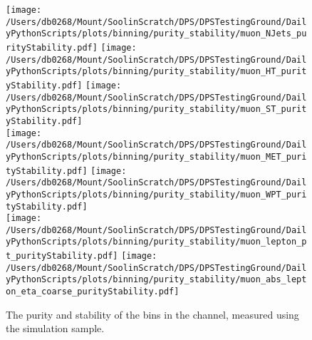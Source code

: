 \begin{figure}[hp]
	\centering
	\texttt{[image: /Users/db0268/Mount/SoolinScratch/DPS/DPSTestingGround/DailyPythonScripts/plots/binning/purity\_stability/muon\_NJets\_purityStability.pdf]} 
	\texttt{[image: /Users/db0268/Mount/SoolinScratch/DPS/DPSTestingGround/DailyPythonScripts/plots/binning/purity\_stability/muon\_HT\_purityStability.pdf]}
	\texttt{[image: /Users/db0268/Mount/SoolinScratch/DPS/DPSTestingGround/DailyPythonScripts/plots/binning/purity\_stability/muon\_ST\_purityStability.pdf]} \\
	\texttt{[image: /Users/db0268/Mount/SoolinScratch/DPS/DPSTestingGround/DailyPythonScripts/plots/binning/purity\_stability/muon\_MET\_purityStability.pdf]}
	\texttt{[image: /Users/db0268/Mount/SoolinScratch/DPS/DPSTestingGround/DailyPythonScripts/plots/binning/purity\_stability/muon\_WPT\_purityStability.pdf]} \\
	\texttt{[image: /Users/db0268/Mount/SoolinScratch/DPS/DPSTestingGround/DailyPythonScripts/plots/binning/purity\_stability/muon\_lepton\_pt\_purityStability.pdf]} 
	\texttt{[image: /Users/db0268/Mount/SoolinScratch/DPS/DPSTestingGround/DailyPythonScripts/plots/binning/purity\_stability/muon\_abs\_lepton\_eta\_coarse\_purityStability.pdf]} \\
	\caption[The purity and stability of the bins in the \muJets{} channel, measured using the \powhegpythia{} simulation sample.]{The purity and stability of the bins in the \muJets{} channel, measured using the \powhegpythia{} simulation sample.}
	\label{fig:PurityStability2}
\end{figure}


